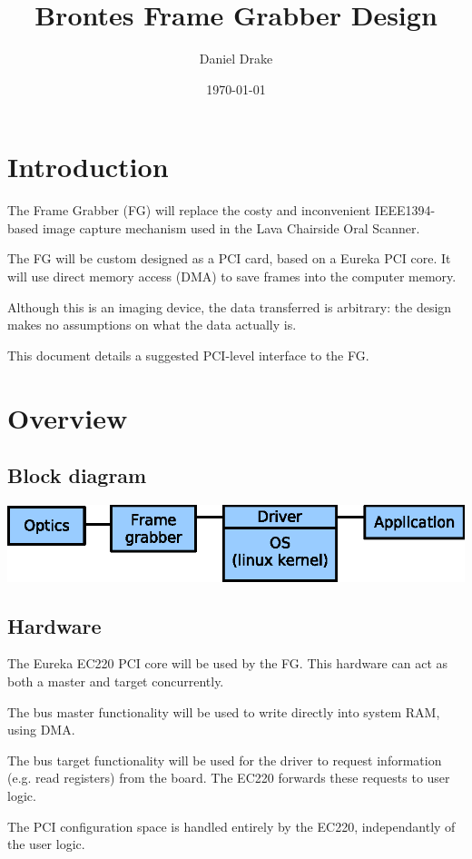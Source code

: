 \documentclass[12pt]{article}
\title{Brontes Frame Grabber Design}
\author{Daniel Drake}
\date{\today}
\begin{document}
\maketitle

\section{Introduction}

The Frame Grabber (FG) will replace the costy and inconvenient IEEE1394-based image capture mechanism used in the Lava Chairside Oral Scanner.

The FG will be custom designed as a PCI card, based on a Eureka PCI core. It will use direct memory access (DMA) to save frames into the computer memory.

Although this is an imaging device, the data transferred is arbitrary: the design makes no assumptions on what the data actually is.

This document details a suggested PCI-level interface to the FG.

\section{Overview}

\subsection{Block diagram}

\includegraphics{block.eps}

\subsection{Hardware}

The Eureka EC220 PCI core will be used by the FG. This hardware can act as both a master and target concurrently.

The bus master functionality will be used to write directly into system RAM, using DMA.

The bus target functionality will be used for the driver to request information (e.g. read registers) from the board. The EC220 forwards these requests to user logic.

The PCI configuration space is handled entirely by the EC220, independantly of the user logic.
\end{document}
